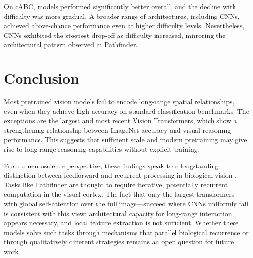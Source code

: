 \documentclass[10pt,letterpaper]{article}
\begin{document}
On cABC, models performed significantly better overall, and the decline with difficulty was more gradual. A broader range of architectures, including CNNs, achieved above-chance performance even at higher difficulty levels. Nevertheless, CNNs exhibited the steepest drop-off as difficulty increased, mirroring the architectural pattern observed in Pathfinder.


\section{Conclusion}

Most pretrained vision models fail to encode long-range spatial relationships, even when they achieve high accuracy on standard classification benchmarks. The exceptions are the largest and most recent Vision Transformers, which show a strengthening relationship between ImageNet accuracy and visual reasoning performance. This suggests that sufficient scale and modern pretraining may give rise to long-range reasoning capabilities without explicit training.

From a neuroscience perspective, these findings speak to a longstanding distinction between feedforward and recurrent processing in biological vision \citep{Houtkamp}. Tasks like Pathfinder are thought to require iterative, potentially recurrent computation in the visual cortex. The fact that only the largest transformers---with global self-attention over the full image---succeed where CNNs uniformly fail is consistent with this view: architectural capacity for long-range interaction appears necessary, and local feature extraction is not sufficient. Whether these models solve such tasks through mechanisms that parallel biological recurrence or through qualitatively different strategies remains an open question for future work.

\end{document}
